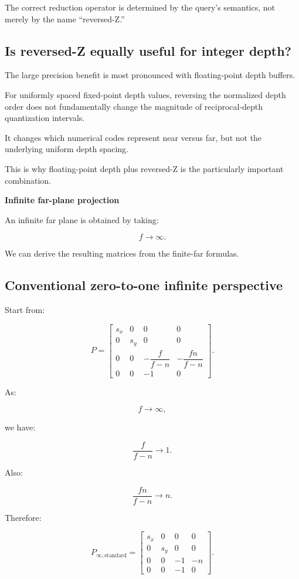 The correct reduction operator is determined by the query's semantics, not merely by the name ``reversed-Z.''

\subsection{Is reversed-Z equally useful for integer depth?}\label{02-foundations-ii-ch033-is-reversed-z-equally-useful-for-integer-depth}

The large precision benefit is most pronounced with floating-point depth buffers.

For uniformly spaced fixed-point depth values, reversing the normalized depth order does not fundamentally change the magnitude of reciprocal-depth quantization intervals.

It changes which numerical codes represent near versus far, but not the underlying uniform depth spacing.

This is why floating-point depth plus reversed-Z is the particularly important combination. 

\textbf{Infinite far-plane projection}

An infinite far plane is obtained by taking:

\[
 \boxed{f\to\infty}.
\]

We can derive the resulting matrices from the finite-far formulas.

\subsection{Conventional zero-to-one infinite perspective}\label{02-foundations-ii-ch033-conventional-zero-to-one-infinite-perspective}

Start from:

\[
 P= \begin{bmatrix} s_x&0&0&0\\ 0&s_y&0&0\\ 0&0&-\dfrac f{f-n}&-\dfrac{fn}{f-n}\\ 0&0&-1&0 \end{bmatrix}.
\]

As:

\[
 f\to\infty,
\]

we have:

\[
 \frac f{f-n}\to1.
\]

Also:

\[
 \frac{fn}{f-n}\to n.
\]

Therefore:

\[
 \boxed{ P_{\infty,\mathrm{standard}}= \begin{bmatrix} s_x&0&0&0\\ 0&s_y&0&0\\ 0&0&-1&-n\\ 0&0&-1&0 \end{bmatrix} }.
\]

